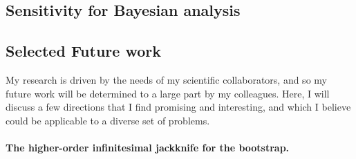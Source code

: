 


\subsection*{Sensitivity for Bayesian analysis}


%
\subsection*{Selected Future work}

My research is driven by the needs of my scientific collaborators, and
so my future work will be determined to a large part by my colleagues.
Here, I will discuss a few directions that I find promising and interesting,
and which I believe could be applicable to a diverse set of problems.

\paragraph{The higher-order infinitesimal jackknife for the bootstrap.}

